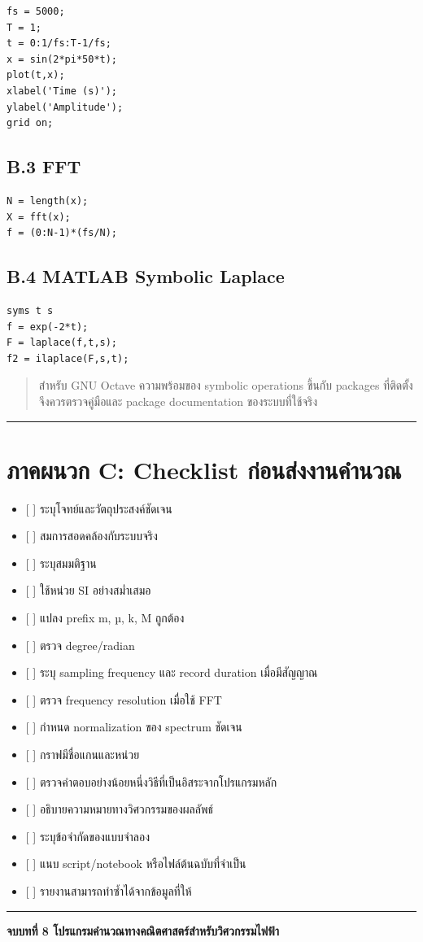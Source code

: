 \begin{verbatim}
fs = 5000;
T = 1;
t = 0:1/fs:T-1/fs;
x = sin(2*pi*50*t);
plot(t,x);
xlabel('Time (s)');
ylabel('Amplitude');
grid on;
\end{verbatim}

\subsection{B.3 FFT}

\begin{verbatim}
N = length(x);
X = fft(x);
f = (0:N-1)*(fs/N);
\end{verbatim}

\subsection{B.4 MATLAB Symbolic Laplace}

\begin{verbatim}
syms t s
f = exp(-2*t);
F = laplace(f,t,s);
f2 = ilaplace(F,s,t);
\end{verbatim}

\begin{quote}
สำหรับ GNU Octave ความพร้อมของ symbolic operations ขึ้นกับ packages ที่ติดตั้ง จึงควรตรวจคู่มือและ package documentation ของระบบที่ใช้จริง
\end{quote}

\par\noindent\rule{\textwidth}{0.4pt}\par

\section{ภาคผนวก C: Checklist ก่อนส่งงานคำนวณ}

\begin{itemize}
    \item {}[ ] ระบุโจทย์และวัตถุประสงค์ชัดเจน
    \item {}[ ] สมการสอดคล้องกับระบบจริง
    \item {}[ ] ระบุสมมติฐาน
    \item {}[ ] ใช้หน่วย SI อย่างสม่ำเสมอ
    \item {}[ ] แปลง prefix m, µ, k, M ถูกต้อง
    \item {}[ ] ตรวจ degree/radian
    \item {}[ ] ระบุ sampling frequency และ record duration เมื่อมีสัญญาณ
    \item {}[ ] ตรวจ frequency resolution เมื่อใช้ FFT
    \item {}[ ] กำหนด normalization ของ spectrum ชัดเจน
    \item {}[ ] กราฟมีชื่อแกนและหน่วย
    \item {}[ ] ตรวจคำตอบอย่างน้อยหนึ่งวิธีที่เป็นอิสระจากโปรแกรมหลัก
    \item {}[ ] อธิบายความหมายทางวิศวกรรมของผลลัพธ์
    \item {}[ ] ระบุข้อจำกัดของแบบจำลอง
    \item {}[ ] แนบ script/notebook หรือไฟล์ต้นฉบับที่จำเป็น
    \item {}[ ] รายงานสามารถทำซ้ำได้จากข้อมูลที่ให้
\end{itemize}

\par\noindent\rule{\textwidth}{0.4pt}\par

\textbf{จบบทที่ 8 โปรแกรมคำนวณทางคณิตศาสตร์สำหรับวิศวกรรมไฟฟ้า}
